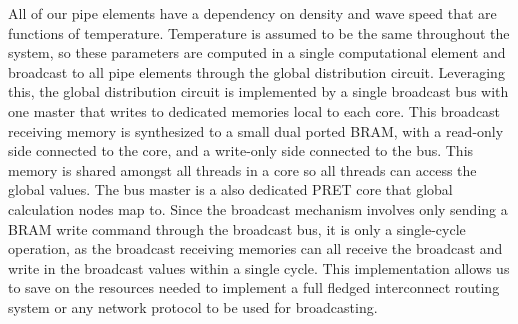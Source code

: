 
All of our pipe elements have a dependency on density and wave speed that are functions of temperature.  
Temperature is assumed to be the same throughout the system, so these parameters are computed in a single computational element and broadcast to all pipe elements through the global distribution circuit.
Leveraging this, the global distribution circuit is implemented by a single broadcast bus with one master that writes to dedicated memories local to each core.
This broadcast receiving memory is synthesized to a small dual ported BRAM, with a read-only side connected to the core, and a write-only side connected to the bus.
This memory is shared amongst all threads in a core so all threads can access the global values.
The bus master is a also dedicated PRET core that global calculation nodes map to. 
Since the broadcast mechanism involves only sending a BRAM write command through the broadcast bus, it is only a single-cycle operation, as the broadcast receiving memories can all receive the broadcast and write in the broadcast values within a single cycle.
This implementation allows us to save on the resources needed to implement a full fledged interconnect routing system or any network protocol to be used for broadcasting. 

